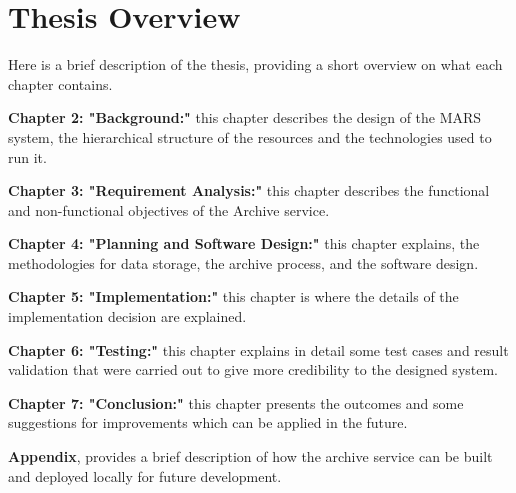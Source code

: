     \section{Thesis Overview} 
        Here is a brief description of the thesis, providing a short overview on what each
        chapter contains.
        
        \par
        \textbf{Chapter 2: "Background:"} this chapter describes the design
        of the MARS system, the hierarchical structure of the resources and the technologies used to
        run it.

        \par
        \textbf{Chapter 3: "Requirement Analysis:"} this chapter describes the functional and
        non-functional objectives of the Archive service.

        \par
        \textbf{Chapter 4: "Planning and Software Design:"} this chapter explains, the 
        methodologies for data storage, the archive process, and the software design.

        \par
        \textbf{Chapter 5: "Implementation:"} this chapter is where the details of the 
        implementation decision are explained.

        \par
        \textbf{Chapter 6: "Testing:"} this chapter explains in detail 
        some test cases and result validation that were carried out to give more credibility to the designed system.

        \par
        \textbf{Chapter 7: "Conclusion:"} this chapter presents the outcomes and some 
        suggestions for improvements which can be applied in the future.
        
        \textbf{Appendix}, provides a brief description of how the archive service can be built and deployed locally for future development.

